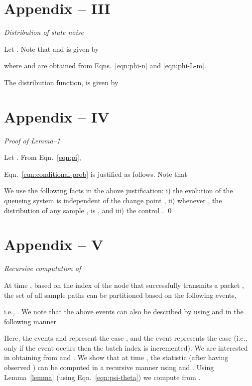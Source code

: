 \documentclass[acmtosn]{acmtrans2m}
\begin{document}
\section*{Appendix -- III}
\emph{Distribution of state noise }


Let .
Note that 
\theta and is given by 

where  and  are obtained from
Eqns.~\ref{eqn:phi-n} and \ref{eqn:phi-L-m}.

The distribution function,
\theta 
is given by




\section*{Appendix -- IV}
\emph{Proof of Lemma--1}


\vspace{2mm}

Let .
From Eqn.~\ref{eqn:pi},
{\footnotesize

}
Eqn.~\ref{eqn:conditional-prob} is justified as follows.
Note that 

We use the following facts in the above justification: i) the 
evolution of the queueing system  is independent of 
the change point , ii) whenever , the distribution 
of any sample ,  is , and 
iii) the control . 
\qed









\section*{Appendix -- V}
\emph{Recursive computation of }


At time , based on the index of the node that successfully transmits
a packet , the set of all sample paths  can be partitioned
based on the following events, 

i.e., .
We note that the above events can also be described by using 
and  in the following manner



Here, the events  and  represent the
case , and the event  represents the
case  (i.e., only if the event 
occurs then the batch index is incremented). We are interested in
obtaining  from  and . 
We show that at time , the statistic  (after having observed ) can be computed in a recursive manner using  and
. Using Lemma~\ref{lemma} (using Eqn.~\ref{eqn:psi-theta}) we
compute  from .
\end{document}
